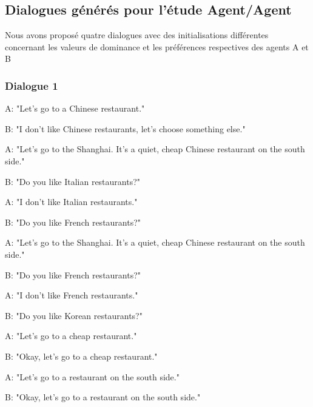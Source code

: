 \begin{appendix}

\chapter{Dialogues générés pour l'étude Agent/Agent}
\label{annexe:crowd}
	Nous avons proposé quatre dialogues avec des initialisations différentes concernant les valeurs de dominance et les préférences respectives des agents A et B
	
	\subsection{Dialogue 1}
		\begin{minipage}{\textwidth}
			{\ttfamily
				\begin{addmargin}[1em]{2em}%
					A: "Let's go to a Chinese restaurant."
					
					\hspace*{3mm}B: "I don't like Chinese restaurants, let's choose something else."
					
					A: "Let's go to the Shanghai. It's a quiet, cheap Chinese restaurant on the south side."
					
					\hspace*{3mm}B: "Do you like Italian restaurants?"
					
					A: "I don't like Italian restaurants."
					
					\hspace*{3mm}B: "Do you like French restaurants?"
					
					A: "Let's go to the Shanghai. It's a quiet, cheap Chinese restaurant on the south side."
					
					\hspace*{3mm}B: "Do you like French restaurants?"
					
					A: "I don't like French restaurants."
					
					\hspace*{3mm}B: "Do you like Korean restaurants?"
					
					A: "Let's go to a cheap restaurant."
					
					\hspace*{3mm}B: "Okay, let's go to a cheap restaurant."
					
					A: "Let's go to a restaurant on the south side."
					
					\hspace*{3mm}B: "Okay, let's go to a restaurant on the south side."
					

\end{addmargin}}
\end{minipage}
\end{appendix}
